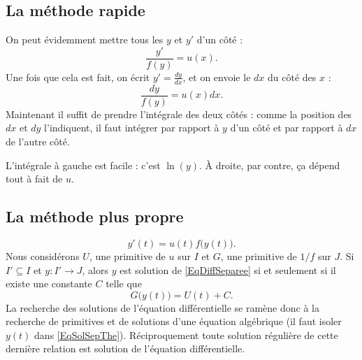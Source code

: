 \subsection{La méthode rapide}

On peut évidemment mettre tous les \( y\) et \( y'\) d'un côté :
\begin{equation}
	\frac{ y' }{ f(y) }=u(x).
\end{equation}
Une fois que cela est fait, on écrit \( y'=\frac{ dy }{ dx }\), et on envoie le \( dx\) du côté des \( x\) :
\begin{equation}
	\frac{ dy }{ f(y) }=u(x)dx.
\end{equation}
Maintenant il suffit de prendre l'intégrale des deux côtés : comme la position des \( dx\) et \( dy\) l'indiquent, il faut intégrer par rapport à \( y\) d'un côté et par rapport à \( dx\) de l'autre côté.

L'intégrale à gauche est facile : c'est \( \ln(y)\). À droite, par contre, ça dépend tout à fait de \( u\).

\subsection{La méthode plus propre}

\begin{equation}
	y'(t)=u(t)f\big( y(t) \big).
\end{equation}
Nous considérons \( U\), une primitive de \( u\) sur \( I\) et \( G\), une primitive de \( 1/f\) sur \( J\).  Si \( I'\subseteq I\) et \( y\colon I'\to J\), alors \( y\) est solution de \eqref{EqDiffSeparee} si et seulement si il existe une constante \( C\) telle que
\begin{equation}		\label{EqSolSepThe}
	G\big( y(t) \big)=U(t)+C.
\end{equation}
La recherche des solutions de l'équation différentielle se ramène donc à la recherche de primitives et de solutions d'une équation algébrique (il faut isoler \( y(t)\) dans \eqref{EqSolSepThe}). Réciproquement toute solution régulière de cette dernière relation est solution de l'équation différentielle.

